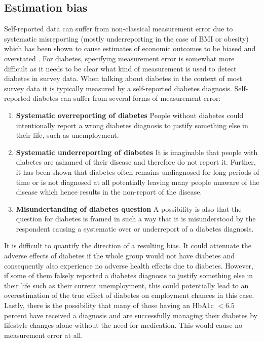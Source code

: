 \subsection{Estimation bias}

Self-reported data can suffer from non-classical measurement
error due to systematic misreporting (mostly underreporting in the
case of \ac{BMI} or obesity) which has been shown to cause estimates
of economic outcomes to be biased and overstated \citep{Cawley2015,ONeill2013,Perks2015}.
For diabetes, specifying measurement error is somewhat more difficult
as it needs to be clear what kind of measurement is used to detect
diabetes in survey data.
When talking about diabetes in the context of most survey data it
is typically measured by a self-reported diabetes diagnosis. Self-reported diabetes can suffer from several forms of measurement error:
\begin{enumerate}
\item \textbf{Systematic overreporting of diabetes}
People without diabetes could intentionally report a wrong diabetes diagnosis to justify something else in their life, such as unemployment.
\item \textbf{Systematic underreporting of diabetes}
It is imaginable that people with diabetes are ashamed of their disease and therefore do not report it. Further, it has been shown that diabetes often remains undiagnosed for long periods of time or is not diagnosed at all potentially leaving many people unaware of the disease which hence results in the non-report of the disease.
\item \textbf{Misundertanding of diabetes question}
A possibility is also that the question for diabetes is framed in such a way that it is misunderstood by the respondent causing a systematic over or underreport of a diabetes diagnosis. 
\end{enumerate}
It is difficult to quantify the direction of a resulting bias. It could attenuate the adverse
effects of diabetes if the whole group would not have diabetes and
consequently also experience no adverse health effects due to diabetes.
However, if some of them falsely reported a diabetes diagnosis to
justify something else in their life such as their current unemployment,
this could potentially lead to an overestimation of the true effect
of diabetes on employment chances in this case. Lastly, there is the
possibility that many of those having an \ac{HbA1c} $<6.5$ percent
have received a diagnosis and are successfully managing their diabetes
by lifestyle changes alone without the need for medication. This would
cause no measurement error at all. 

